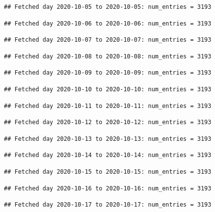 \documentclass[]{article}
\begin{document}
\begin{verbatim}
## Fetched day 2020-10-05 to 2020-10-05: num_entries = 3193
\end{verbatim}

\begin{verbatim}
## Fetched day 2020-10-06 to 2020-10-06: num_entries = 3193
\end{verbatim}

\begin{verbatim}
## Fetched day 2020-10-07 to 2020-10-07: num_entries = 3193
\end{verbatim}

\begin{verbatim}
## Fetched day 2020-10-08 to 2020-10-08: num_entries = 3193
\end{verbatim}

\begin{verbatim}
## Fetched day 2020-10-09 to 2020-10-09: num_entries = 3193
\end{verbatim}

\begin{verbatim}
## Fetched day 2020-10-10 to 2020-10-10: num_entries = 3193
\end{verbatim}

\begin{verbatim}
## Fetched day 2020-10-11 to 2020-10-11: num_entries = 3193
\end{verbatim}

\begin{verbatim}
## Fetched day 2020-10-12 to 2020-10-12: num_entries = 3193
\end{verbatim}

\begin{verbatim}
## Fetched day 2020-10-13 to 2020-10-13: num_entries = 3193
\end{verbatim}

\begin{verbatim}
## Fetched day 2020-10-14 to 2020-10-14: num_entries = 3193
\end{verbatim}

\begin{verbatim}
## Fetched day 2020-10-15 to 2020-10-15: num_entries = 3193
\end{verbatim}

\begin{verbatim}
## Fetched day 2020-10-16 to 2020-10-16: num_entries = 3193
\end{verbatim}

\begin{verbatim}
## Fetched day 2020-10-17 to 2020-10-17: num_entries = 3193
\end{verbatim}
\end{document}
